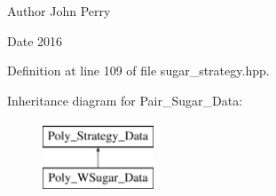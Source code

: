 \begin{DoxyAuthor}{Author}
John Perry 
\end{DoxyAuthor}
\begin{DoxyDate}{Date}
2016 
\end{DoxyDate}


Definition at line 109 of file sugar\+\_\+strategy.\+hpp.

Inheritance diagram for Pair\+\_\+\+Sugar\+\_\+\+Data\+:\begin{figure}[H]
\begin{center}
\leavevmode
\includegraphics[height=2.000000cm]{group__strategygroup}
\end{center}
\end{figure}
